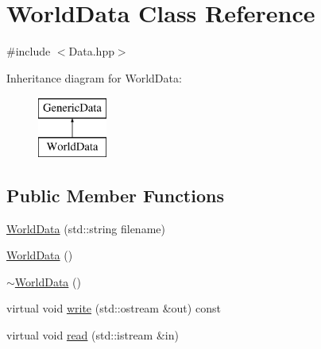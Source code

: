 \hypertarget{class_world_data}{\section{World\-Data Class Reference}
\label{class_world_data}
}


{\ttfamily \#include $<$Data.\-hpp$>$}

Inheritance diagram for World\-Data\-:\begin{figure}[H]
\begin{center}
\leavevmode
\includegraphics[height=2.000000cm]{class_world_data}
\end{center}
\end{figure}
\subsection*{Public Member Functions}
\begin{DoxyCompactItemize}
\item 
\hyperlink{class_world_data_ad41fc6d2b0c96c6a72569ab32845d342}{World\-Data} (std\-::string filename)
\item 
\hyperlink{class_world_data_abd98753437fa7acfc408d87314b63003}{World\-Data} ()
\item 
\hyperlink{class_world_data_a2a9ddeaaf31f4fcfdd6d0c3ff6d6b2c6}{$\sim$\-World\-Data} ()
\item 
virtual void \hyperlink{class_world_data_aa8a0d950e6d52f7c7baebb722804f55d}{write} (std\-::ostream \&out) const 
\item 
virtual void \hyperlink{class_world_data_aa80956a9e1337417f570f776edeb1c5e}{read} (std\-::istream \&in)
\end{DoxyCompactItemize}
